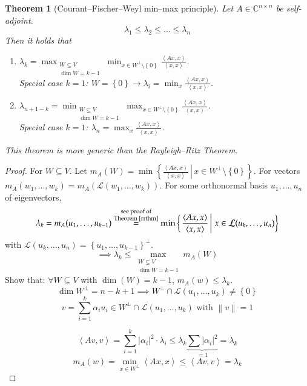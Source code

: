\documentclass{article}
\newcounter{lecref}[section]
\numberwithin{lecref}{section}
\newtheorem{theorem}[lecref]{Theorem}
\newcommand{\set}[1]{\left\{#1\right\}}
\newcommand{\setdef}[2]{\left\{\left.#1\,\right|\,#2\right\}}
\newcommand{\angel}[1]{\left\langle#1\right\rangle}
\newcommand{\norm}[1]{\left\|#1\right\|}
\newcommand{\card}[1]{\left|#1\right|}
\begin{document}
\begin{theorem}[Courant--Fischer--Weyl min--max principle] %
  \label{cfw-mm}
  Let $A \in \mathbb C^{n \times n}$ be self-adjoint.
  \[ \lambda_1 \leq \lambda_2 \leq \dots \leq \lambda_n \]
  Then it holds that
  \begin{enumerate}
    \item $\lambda_k = \max_{\substack{W \subseteq V \\ \dim{W} = k - 1}} \min_{x \in W^\bot \setminus \set{0}} \frac{\angel{Ax, x}}{\angel{x, x}}$. \\
    Special case $k = 1$: $W = \set{0} \to \lambda_i = \min_x \frac{\angel{Ax, x}}{\angel{x, x}}$.
    \item $\lambda_{n+1 - k} = \min_{\substack{W \subseteq V \\ \dim{W} = k-1}} \max_{x \in W^\bot \setminus \set{0}} \frac{\angel{Ax, x}}{\angel{x, x}}$. \\
    Special case $k = 1$: $\lambda_n = \max_x \frac{\angel{Ax, x}}{\angel{x, x}}$.
  \end{enumerate}
  This theorem is more generic than the Rayleigh--Ritz Theorem.
\end{theorem}

\begin{proof}
  For $W \subseteq V$.
  Let $m_A(W) = \min\setdef{\frac{\angel{Ax, x}}{\angel{x, x}}}{x \in W^\bot \setminus \set{0}}$.
  For vectors $m_A(w_1, \dots, w_k) = m_A(\mathcal L(w_1, \dots, w_k))$.
  For some orthonormal basis $u_1, \dots, u_n$ of eigenvectors,
  \[ \lambda_k = m_A(u_1, \dots, u_{k-1}) \overset{\substack{\text{see proof of} \\ \text{Theorem~\ref{rrthm}}}}{=} \min \setdef{\frac{\angel{Ax, x}}{\angel{x, x}}}{x \in \mathcal L(u_k, \dots, u_n)} \]
  with $\mathcal L(u_k, \dots, u_n) = \set{u_1, \dots, u_{k-1}}^\bot$.
  \[ \implies \lambda_k \leq \max_{\substack{W \subseteq V \\ \dim{W} = k - 1}} m_A(W) \]
  Show that: $\forall W \subseteq V$ with $\dim(W) = k-1$, $m_A(w) \leq \lambda_k$.
  \[ \dim{W^{\bot}} = n - k + 1 \implies W^\bot \cap \mathcal L(u_1, \dots, u_k) \neq \set{0} \]
  \[ v = \sum_{i=1}^k \alpha_i u_i \in W^\bot \cap \mathcal L(u_1, \dots, u_k) \text{ with } \norm{v} = 1 \]

  \[ \angel{Av, v} = \sum_{i=1}^k \card{\alpha_i}^2 \cdot \lambda_i \leq \lambda_k \underbrace{\sum \card{\alpha_i}^2}_{=1} = \lambda_k \]
  \[ m_A(w) = \min_{x \in W^\bot} \angel{Ax, x} \leq \angel{Av, v} = \lambda_k \]
\end{proof}
\end{document}
